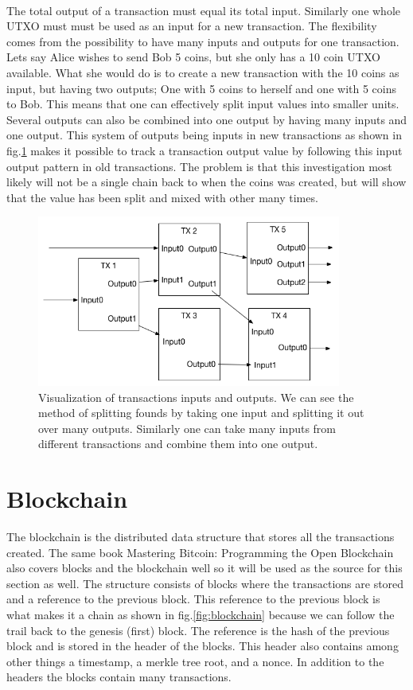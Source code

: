 \documentclass[informationsecurity]{gucmasterproject}
\begin{document}
\paragraph{}
The total output of a transaction must equal its total input. Similarly one whole UTXO must must be used as an input for a new transaction.
The flexibility comes from the possibility to have many inputs and outputs for one transaction.
Lets say Alice wishes to send Bob 5 coins, but she only has a 10 coin UTXO available. What she would do is to create a new transaction with the 10 coins as input, but having two outputs; One with 5 coins to herself and one with 5 coins to Bob.
This means that one can effectively split input values into smaller units. Several outputs can also be combined into one output by having many inputs and one output. 
This system of outputs being inputs in new transactions as shown in fig.\ref{fig:ln_trans} makes it possible to track a transaction output value by following this input output pattern in old transactions. The problem is that this investigation most likely will not be a single chain back to when the coins was created, but will show that the value has been split and mixed with other many times.


\begin{figure}[h]
    \centering
    \includegraphics[width=10cm]{LN_Trans.png}
    \caption{Visualization of transactions inputs and outputs. We can see the method of splitting founds by taking one input and splitting it out over many outputs. Similarly one can take many inputs from different transactions and combine them into one output.}
    \label{fig:ln_trans}
\end{figure}

\section{Blockchain}
The blockchain is the distributed data structure that stores all the transactions created. The same book Mastering Bitcoin: Programming the Open Blockchain \cite{antonopoulos2017mastering} also covers blocks and the blockchain well so it will be used as the source for this section as well. The structure consists of blocks where the transactions are stored and a reference to the previous block. This reference to the previous block is what makes it a chain as shown in fig.\ref{fig:blockchain} because we can follow the trail back to the genesis (first) block. The reference is the hash of the previous block and is stored in the header of the blocks. This header also contains among other things a timestamp, a merkle tree root, and a nonce. In addition to the headers the blocks contain many transactions.
\end{document}
